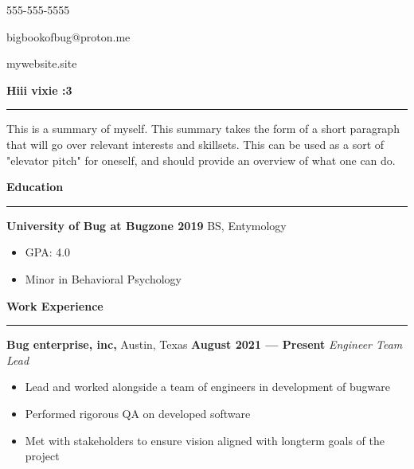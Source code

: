 \documentclass[a4paper, 12pt]{article}
\begin{document}
\begin{flushright}
{\fontsize{12pt}{12pt}\selectfont
\item 555-555-5555
\item bigbookofbug@proton.me
\item mywebsite.site
}\end{flushright}
\vspace{-40pt}
\begin{flushleft}
{\fontsize{16pt}{16pt}\selectfont
{\textbf{Hiii vixie :3}}}
\noindent\rule{\textwidth}{0.4pt}
\end{flushleft}
\begin{flushleft}
{\fontsize{12pt}{12pt}\selectfont
This is a summary of myself. This summary takes the form of a short paragraph that will go over relevant interests and skillsets. This can be used as a sort of "elevator pitch" for oneself, and should provide an overview of what one can do.}
\newline
\end{flushleft}
\begin{flushleft}
{\fontsize{12pt}{12pt}\selectfont
\textbf{Education}}
\noindent\rule{\textwidth}{0.4pt}
\end{flushleft}
\begin{flushleft}
{\textbf{University of Bug at Bugzone \hfill 2019}}
\newline
BS, Entymology\begin{multicols}{2}
\begin{itemize}
\item GPA: 4.0
\item Minor in Behavioral Psychology
\end{itemize}
\end{multicols}
\end{flushleft}
\begin{flushleft}
{\fontsize{12pt}{12pt}\selectfont \textbf{Work Experience}}
\noindent\rule{\textwidth}{0.4pt}
\end{flushleft}
\begin{flushleft}
{\textbf{Bug enterprise, inc,} Austin, Texas \hfill 
\textbf{August 2021 --- Present}}
\newline
\textit{Engineer Team Lead}
\begin{itemize}
\item Lead and worked alongside a team of engineers in development of bugware
\item Performed rigorous QA on developed software
\item Met with stakeholders to ensure vision aligned with longterm goals of the project
\end{itemize}
\end{flushleft}
\end{document}
